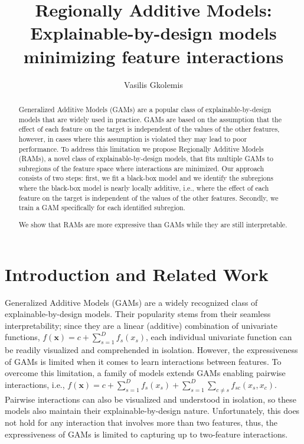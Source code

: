 \documentclass[12pt]{article}
\title{Regionally Additive Models: Explainable-by-design models minimizing feature interactions}
\author{Vasilis Gkolemis}
\newcommand{\xb}{\mathbf{x}}
\begin{document}
\maketitle

\begin{abstract}
Generalized Additive Models (GAMs) are a popular class of explainable-by-design models that are widely used in practice.
GAMs are based on the assumption that the effect of each feature on the target is independent of the values of the
other features, however, in cases where this assumption is violated they may lead to poor performance.
To address this limitation we propose Regionally Additive Models (RAMs), a novel class of explainable-by-design models,
that fits multiple GAMs to subregions of the feature space where interactions are minimized.
Our approach consists of two steps: first, we fit a black-box model and we identify the subregions where the black-box model is nearly locally additive,
i.e., where the effect of each feature on the target is independent of the values of the other features.
Secondly, we train a GAM specifically for each identified subregion.

We show that RAMs are more expressive than GAMs while they are still interpretable.

\end{abstract}

\section{Introduction and Related Work}


Generalized Additive Models (GAMs) are a widely recognized class of explainable-by-design models.
Their popularity stems from their seamless interpretability; since they are a linear (additive) combination of univariate functions,
\(f(\xb) = c + \sum_{s=1}^D f_s(x_s)\), each individual univariate function can be readily visualized and comprehended in isolation.
However, the expressiveness of GAMs is limited when it comes to learn interactions between features.
To overcome this limitation, a family of models extends GAMs enabling pairwise interactions,
i.e., \(f(\xb) = c + \sum_{s=1}^D f_s(x_s) + \sum_{s=1}^D \sum_{c \neq s} f_{sc}(x_s, x_c)\).
Pairwise interactions can also be visualized and understood in isolation, so these models also maintain their explainable-by-design nature.
Unfortunately, this does not hold for any interaction that involves more than two features, thus, the expressiveness of GAMs is limited to capturing up to two-feature interactions.
\end{document}

